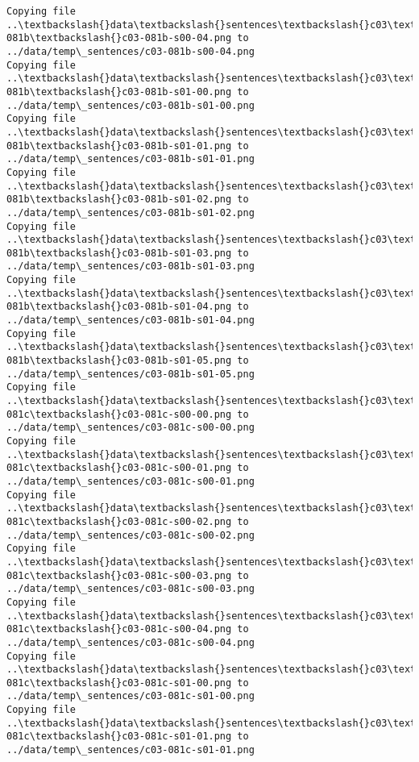 \documentclass[11pt]{article}
\begin{document}
\begin{Verbatim}[commandchars=\\\{\}]
Copying file ..\textbackslash{}data\textbackslash{}sentences\textbackslash{}c03\textbackslash{}c03-081b\textbackslash{}c03-081b-s00-04.png to
../data/temp\_sentences/c03-081b-s00-04.png
Copying file ..\textbackslash{}data\textbackslash{}sentences\textbackslash{}c03\textbackslash{}c03-081b\textbackslash{}c03-081b-s01-00.png to
../data/temp\_sentences/c03-081b-s01-00.png
Copying file ..\textbackslash{}data\textbackslash{}sentences\textbackslash{}c03\textbackslash{}c03-081b\textbackslash{}c03-081b-s01-01.png to
../data/temp\_sentences/c03-081b-s01-01.png
Copying file ..\textbackslash{}data\textbackslash{}sentences\textbackslash{}c03\textbackslash{}c03-081b\textbackslash{}c03-081b-s01-02.png to
../data/temp\_sentences/c03-081b-s01-02.png
Copying file ..\textbackslash{}data\textbackslash{}sentences\textbackslash{}c03\textbackslash{}c03-081b\textbackslash{}c03-081b-s01-03.png to
../data/temp\_sentences/c03-081b-s01-03.png
Copying file ..\textbackslash{}data\textbackslash{}sentences\textbackslash{}c03\textbackslash{}c03-081b\textbackslash{}c03-081b-s01-04.png to
../data/temp\_sentences/c03-081b-s01-04.png
Copying file ..\textbackslash{}data\textbackslash{}sentences\textbackslash{}c03\textbackslash{}c03-081b\textbackslash{}c03-081b-s01-05.png to
../data/temp\_sentences/c03-081b-s01-05.png
Copying file ..\textbackslash{}data\textbackslash{}sentences\textbackslash{}c03\textbackslash{}c03-081c\textbackslash{}c03-081c-s00-00.png to
../data/temp\_sentences/c03-081c-s00-00.png
Copying file ..\textbackslash{}data\textbackslash{}sentences\textbackslash{}c03\textbackslash{}c03-081c\textbackslash{}c03-081c-s00-01.png to
../data/temp\_sentences/c03-081c-s00-01.png
Copying file ..\textbackslash{}data\textbackslash{}sentences\textbackslash{}c03\textbackslash{}c03-081c\textbackslash{}c03-081c-s00-02.png to
../data/temp\_sentences/c03-081c-s00-02.png
Copying file ..\textbackslash{}data\textbackslash{}sentences\textbackslash{}c03\textbackslash{}c03-081c\textbackslash{}c03-081c-s00-03.png to
../data/temp\_sentences/c03-081c-s00-03.png
Copying file ..\textbackslash{}data\textbackslash{}sentences\textbackslash{}c03\textbackslash{}c03-081c\textbackslash{}c03-081c-s00-04.png to
../data/temp\_sentences/c03-081c-s00-04.png
Copying file ..\textbackslash{}data\textbackslash{}sentences\textbackslash{}c03\textbackslash{}c03-081c\textbackslash{}c03-081c-s01-00.png to
../data/temp\_sentences/c03-081c-s01-00.png
Copying file ..\textbackslash{}data\textbackslash{}sentences\textbackslash{}c03\textbackslash{}c03-081c\textbackslash{}c03-081c-s01-01.png to
../data/temp\_sentences/c03-081c-s01-01.png

\end{Verbatim}
\end{document}
